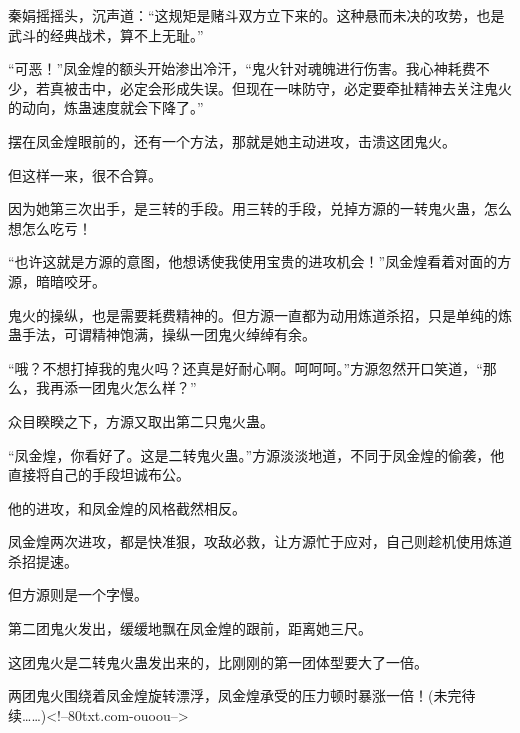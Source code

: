\begin{this_body}
秦娟摇摇头，沉声道：“这规矩是赌斗双方立下来的。这种悬而未决的攻势，也是武斗的经典战术，算不上无耻。”

“可恶！”凤金煌的额头开始渗出冷汗，“鬼火针对魂魄进行伤害。我心神耗费不少，若真被击中，必定会形成失误。但现在一味防守，必定要牵扯精神去关注鬼火的动向，炼蛊速度就会下降了。”

摆在凤金煌眼前的，还有一个方法，那就是她主动进攻，击溃这团鬼火。

但这样一来，很不合算。

因为她第三次出手，是三转的手段。用三转的手段，兑掉方源的一转鬼火蛊，怎么想怎么吃亏！

“也许这就是方源的意图，他想诱使我使用宝贵的进攻机会！”凤金煌看着对面的方源，暗暗咬牙。

鬼火的操纵，也是需要耗费精神的。但方源一直都为动用炼道杀招，只是单纯的炼蛊手法，可谓精神饱满，操纵一团鬼火绰绰有余。

“哦？不想打掉我的鬼火吗？还真是好耐心啊。呵呵呵。”方源忽然开口笑道，“那么，我再添一团鬼火怎么样？”

众目睽睽之下，方源又取出第二只鬼火蛊。

“凤金煌，你看好了。这是二转鬼火蛊。”方源淡淡地道，不同于凤金煌的偷袭，他直接将自己的手段坦诚布公。

他的进攻，和凤金煌的风格截然相反。

凤金煌两次进攻，都是快准狠，攻敌必救，让方源忙于应对，自己则趁机使用炼道杀招提速。

但方源则是一个字慢。

第二团鬼火发出，缓缓地飘在凤金煌的跟前，距离她三尺。

这团鬼火是二转鬼火蛊发出来的，比刚刚的第一团体型要大了一倍。

两团鬼火围绕着凤金煌旋转漂浮，凤金煌承受的压力顿时暴涨一倍！(未完待续……)<!--80txt.com-ouoou-->

\end{this_body}

